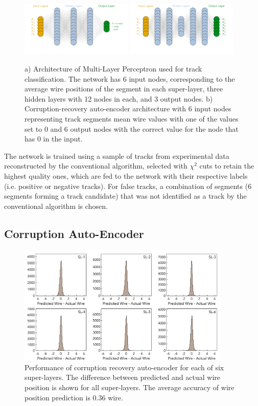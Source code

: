 \documentclass{webofc}
\begin{document}
 \begin{figure}[!ht]
\begin{center}
  \includegraphics[width=2.1in]{images/mlp_diagram.pdf}
  \includegraphics[width=2.1in]{images/aue_diagram.pdf}
\caption {a) Architecture of Multi-Layer Perceptron used for track classification. The network has 6 input nodes,
corresponding to the average wire positions of the segment in each super-layer, three hidden layers with 12 nodes 
in each, and 3 output nodes. b) Corruption-recovery auto-encoder architecture with 6 input nodes representing track segments 
mean wire values with one of the values set to 0 and 6 output nodes with the correct value for the node 
that has 0 in the input. }
 \label{mlp:architecture}
 \end{center}
\end{figure}

The network is trained using a sample of tracks from experimental data reconstructed by the conventional algorithm, 
selected with $\chi^2$ cuts to retain the highest quality ones, which are fed to the network with their respective labels 
(i.e. positive or negative tracks). For false tracks, a combination of segments (6 segments forming a track 
candidate) that was not identified as a track by the conventional algorithm is chosen.

 \subsection{Corruption Auto-Encoder}
 
 \begin{figure}[!ht]
\begin{center}
\includegraphics[width=4.0in]{images/encoder_performance.pdf}
\caption {Performance of corruption recovery auto-encoder for each of six super-layers. The difference between predicted and actual 
wire position is shown for all super-layers. The average accuracy of wire position prediction is  $0.36$ wire.}
 \label{autoencoder:performance}
 \end{center}
\end{figure}
\end{document}
